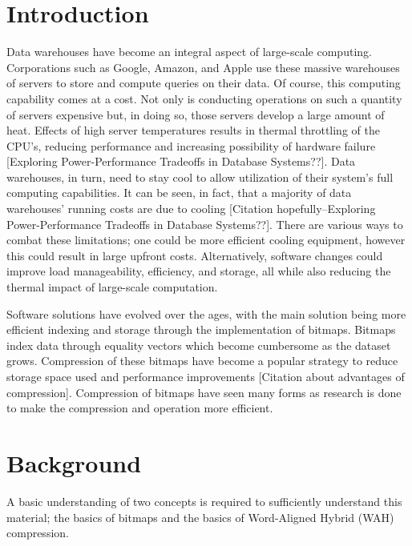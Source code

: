 \documentclass{article}
\begin{document}
\section{Introduction}
Data warehouses have become an integral aspect of large-scale computing. Corporations such as Google, Amazon, and Apple use these massive warehouses of servers to store and compute queries on their data. Of course, this computing capability comes at a cost. Not only is conducting operations on such a quantity of servers expensive but, in doing so, those servers develop a large amount of heat. Effects of high server temperatures results in thermal throttling of the CPU's, reducing performance and increasing possibility of hardware failure [Exploring Power-Performance Tradeoffs in Database Systems??].
Data warehouses, in turn, need to stay cool to allow utilization of their system's full computing capabilities. It can be seen, in fact, that a majority of data warehouses' running costs are due to cooling [Citation hopefully--Exploring Power-Performance Tradeoffs in Database Systems??].
There are various ways to combat these limitations; one could be more efficient cooling equipment, however this could result in large upfront costs. Alternatively, software changes could improve load manageability, efficiency, and storage, all while also reducing the thermal impact of large-scale computation.
\par
Software solutions have evolved over the ages, with the main solution being more efficient indexing and storage through the implementation of bitmaps. Bitmaps index data through equality vectors which become cumbersome as the dataset grows.  %
Compression of these bitmaps have become a popular strategy to reduce storage space used and performance improvements [Citation about advantages of compression]. Compression of bitmaps have seen many forms as research is done to make the compression and operation more efficient. 
%
%
\section{Background}
A basic understanding of two concepts is required to sufficiently understand this material; the basics of bitmaps and the basics of Word-Aligned Hybrid (WAH) compression. \par
\end{document}

